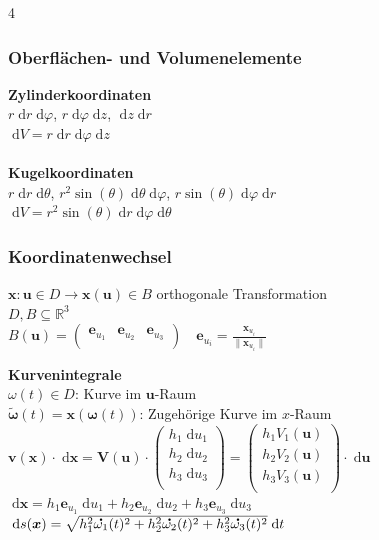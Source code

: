 \documentclass[6pt,a4paper]{scrartcl}
\newcommand{\norm}[1]{\ensuremath{\|#1\|}}                                                      %
\newcommand{\vect}[1]{\ensuremath{\begin{pmatrix} #1 \end{pmatrix}}}                            %
\renewcommand{\vec}[1]{\ensuremath{\boldsymbol {#1}}}                                           %
\renewcommand{\emph}[1]{\textbf{#1}}                                                            %
\renewcommand*{\dot}[1]{\accentset{\mbox{\textrm{\large\bfseries .}} }{#1}}                     %
\newcommand{\ra}[0]{\ensuremath{\rightarrow}}                                  %
\newcommand{\diff}{\ensuremath{\;\mathrm d}}                                   %
\newcommand{\R}{\ensuremath{\mathbb R}}
\begin{document}
\begin{multicols*}{4}
    \subsubsection{Oberflächen- und Volumenelemente}
    \textbf{Zylinderkoordinaten} \\
    $r\diff r\diff\varphi$, \quad $r\diff\varphi\diff z$, \quad $\diff z\diff r$ \\
    $\diff V = r\diff r\diff\varphi \diff z$ \\ \\
    \textbf{Kugelkoordinaten} \\
    $r\diff r\diff\theta$, \quad $r^2 \sin(\theta)\diff\theta\diff\varphi$, \quad $r \sin(\theta)\diff \varphi\diff r$ \\
    $\diff V = r^2 \sin(\theta)\diff r\diff\varphi \diff \theta$

    \subsubsection{Koordinatenwechsel}
    $\vec{x}:\vec{u} \in D \ra \vec{x}(\vec{u}) \in B$ orthogonale Transformation\\
    $D, B \subseteq \R^3$\\

    $B(\vec{u}) = \begin{pmatrix}
            \vec{e}_{u_1} & \vec{e}_{u_2} & \vec{e}_{u_3} \\
        \end{pmatrix} \quad \vec{e}_{u_i} = \frac{\vec{x}_{u_i}}{\norm{\vec{x}_{u_i}}}$\\
    \boxed{\vec{v}(\vec{x}(\vec{u})) = B(\vec{u}) \vec{V}(\vec{u})}

    \emph{Kurvenintegrale}\\
    $\omega(t) \in D$: Kurve im $\vec{u}$-Raum\\
    $\tilde{\vec{\omega}}(t) = \vec{x}(\vec{\omega}(t))$: Zugehörige Kurve im $x$-Raum\\

    $\vec{v}(\vec{x}) \cdot \diff \vec{x} = \vec{V}(\vec{u}) \cdot \vect{h_1 \diff u_1 \\ h_2 \diff u_2 \\ h_3 \diff u_3\\} = \vect{h_1 V_1(\vec{u}) \\ h_2 V_2(\vec{u}) \\ h_3 V_3(\vec{u})\\} \cdot \diff \vec{u}$\\
    $\diff \vec{x} = h_1 \vec{e}_{u_1} \diff u_1 + h_2 \vec{e}_{u_2} \diff u_2 + h_3 \vec{e}_{u_3} \diff u_3$\\
    $\diff s(\vec{x}) = \sqrt{h_1^2 \dot{\omega_1}(t)^2 + h_2^2 \dot{\omega_2}(t)^2 + h_3^2 \dot{\omega_3}(t)^2} \diff t$


\end{multicols*}
\end{document}
